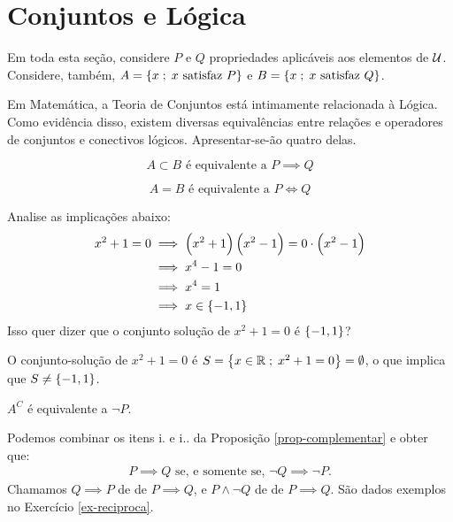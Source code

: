 ﻿\section{Conjuntos e Lógica}

\begin{remark}
Em toda esta seção, considere $P$ e $Q$ propriedades aplicáveis aos elementos de $\mathcal{U}$.
Considere, também, $A = \left\{ x \;;\; x \text{ satisfaz } P\right\}$ e $B= \left\{ x \;;\; x \text{ satisfaz } Q\right\}$.
\end{remark}

\noindent
Em Matemática, a Teoria de Conjuntos está intimamente relacionada à Lógica.
Como evidência disso, existem diversas equivalências entre relações e operadores de conjuntos e conectivos lógicos.
Apresentar-se-ão quatro delas.

\begin{equivalence} 
$$A \subset B \text{ é equivalente a } P \implies Q$$
\end{equivalence}

\begin{equivalence} 
	$$A=B \text{ é equivalente a } P \iff Q$$
\end{equivalence}

\begin{example}
Analise as implicações abaixo:
\begin{equation*}
\begin{aligned}
x^2+1=0 & \implies \left(x^2 +1 \right) \left( x^2-1 \right) = 0
\cdot \left( x^2-1 \right) \\
& \implies x^4 - 1 = 0 \\
& \implies x^4 = 1 \\
& \implies x \in \left\{ -1, 1\right\}
\end{aligned}
\end{equation*}
%
Isso quer dizer que o conjunto solução de $x^2 +1 = 0$ é $\left\{ -1,
1\right\}$?
\end{example}

\begin{solution}
O conjunto-solução de $x^2 + 1 = 0$ é $S = \left\{ x \in \mathbb{R} \;;\; x^2 + 1 = 0\right\} = \emptyset$, o que implica que $S \ne \left\{ -1,1\right\}$.
\end{solution}

\begin{equivalence} 
$A^C$ é equivalente a $\neg P$.
\end{equivalence}
Podemos combinar os itens i. e i.. da Proposição \ref{prop-complementar} e obter que:
%
\begin{align*}
P \implies Q \text{ se, e somente se, } \neg Q \implies \neg P.	
\end{align*}
%
Chamamos $Q \implies P$ de  de $P \implies Q$, e $P \land \neg Q$ de \newline de $P \implies Q$. São dados exemplos no Exercício \ref{ex-reciproca}.

